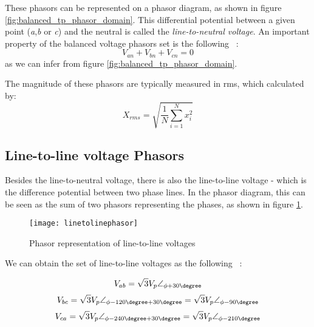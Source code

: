 These phasors can be represented on a phasor diagram, as shown in figure \ref{fig:balanced_tp_phasor_domain}. This differential potential between a given point (\emph{a},\emph{b} or \emph{c}) and the neutral is called the \emph{line-to-neutral voltage}. 
An important property of the balanced voltage phasors set is the following ~\cite[chapter 11, p.~547]{Helfenstein2000}:
\begin{equation} \label{eq:balanced_prop1}
	V_{an} + V_{bn} + V_{cn} = 0
\end{equation}
as we can infer from figure \ref{fig:balanced_tp_phasor_domain}.

The magnitude of these phasors are typically measured in \acrfull{rms}, which calculated by:
\begin{equation} \label{eq:rms}
	X_{rms} = \sqrt{\frac{1}{N}\sum\limits_{i=1}^{N}x_{i}^2}
\end{equation}

\subsection{Line-to-line voltage Phasors}

Besides the line-to-neutral voltage, there is also the line-to-line voltage - which is the difference potential between two phase lines.
In the phasor diagram, this can be seen as the sum of two phasors representing the phases, as shown in figure \ref{fig:line_to_line_phasors}.


\begin{figure}[htbp]
	\centering
	\texttt{[image: linetolinephasor]}
	\caption{Phasor representation of line-to-line voltages}
	\label{fig:line_to_line_phasors}
\end{figure}

We can obtain the set of line-to-line voltages as the following ~\cite[chapter 11, p.~548]{Helfenstein2000}:

\begin{equation} \label{eq:balanced_tpVab}
	V_{ab} = \sqrt{3}V_{p}\angle_{\phi+30\degree}
\end{equation}
\begin{equation} \label{eq:balanced_tpVbc}
	V_{bc} = \sqrt{3}V_{p}\angle_{\phi - 120\degree + 30\degree} = \sqrt{3}V_{p}\angle_{\phi - 90\degree}
\end{equation}
\begin{equation} \label{eq:balanced_tpVca}
	V_{ca} = \sqrt{3}V_{p}\angle_{\phi - 240\degree + 30\degree} = \sqrt{3}V_{p}\angle_{\phi -210\degree} 
\end{equation}

